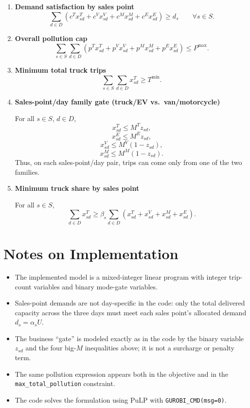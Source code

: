 \begin{enumerate}
    \item \textbf{Demand satisfaction by sales point}
    \[
    \sum_{d\in D}
    \left(
    c^T x^T_{sd}
    + c^V x^V_{sd}
    + c^M x^M_{sd}
    + c^E x^E_{sd}
    \right)
    \ge d_s
    \qquad \forall s\in S.
    \]

    \item \textbf{Overall pollution cap}
    \[
    \sum_{s\in S}\sum_{d\in D}
    \left(
    p^T x^T_{sd}
    + p^V x^V_{sd}
    + p^M x^M_{sd}
    + p^E x^E_{sd}
    \right)
    \le P^{\max}.
    \]

    \item \textbf{Minimum total truck trips}
    \[
    \sum_{s\in S}\sum_{d\in D} x^T_{sd} \ge T^{\min}.
    \]

    \item \textbf{Sales-point/day family gate (truck/EV vs.\ van/motorcycle)}
    
    For all \(s\in S\), \(d\in D\),
    \[
    x^T_{sd} \le M^T z_{sd},
    \]
    \[
    x^E_{sd} \le M^E z_{sd},
    \]
    \[
    x^V_{sd} \le M^V (1-z_{sd}),
    \]
    \[
    x^M_{sd} \le M^M (1-z_{sd}).
    \]
    Thus, on each sales-point/day pair, trips can come only from one of the two families.

    \item \textbf{Minimum truck share by sales point}
    
    For all \(s\in S\),
    \[
    \sum_{d\in D} x^T_{sd}
    \ge
    \beta_s
    \sum_{d\in D}
    \left(
    x^T_{sd}+x^V_{sd}+x^M_{sd}+x^E_{sd}
    \right).
    \]
\end{enumerate}

\section*{Notes on Implementation}

\begin{itemize}
    \item The implemented model is a mixed-integer linear program with integer trip-count variables and binary mode-gate variables.
    \item Sales-point demands are not day-specific in the code: only the total delivered capacity across the three days must meet each sales point's allocated demand \(d_s=\alpha_s U\).
    \item The business ``gate'' is modeled exactly as in the code by the binary variable \(z_{sd}\) and the four big-\(M\) inequalities above; it is not a surcharge or penalty term.
    \item The same pollution expression appears both in the objective and in the \texttt{max\_total\_pollution} constraint.
    \item The code solves the formulation using PuLP with \texttt{GUROBI\_CMD(msg=0)}.
\end{itemize}
